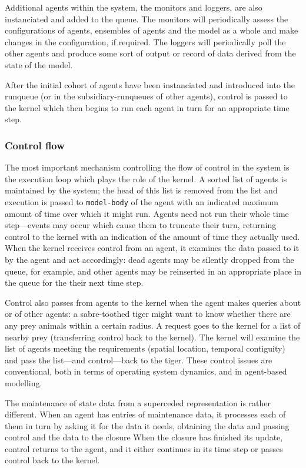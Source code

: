Additional agents within the system, the monitors and loggers, are
also instanciated and added to the queue. The monitors will
periodically assess the configurations of agents, ensembles of agents
and the model as a whole and make changes in the configuration, if
required.  The loggers will periodically poll the other agents and
produce some sort of output or record of data derived from the state
of the model.

After the initial cohort of agents have been instanciated and
introduced into the runqueue (or in the subsidiary-runqueues of other
agents), control is passed to the kernel which then begins to run each
agent in turn for an appropriate time step.

\subsubsection{Control flow}

The most important mechanism controlling the flow of control in the
system is the execution loop which plays the role of the kernel. A
sorted list of agents is maintained by the system; the head of this
list is removed from the list and execution is passed to
\texttt{model-body} of the agent with an indicated maximum amount of
time over which it might run.  Agents need not run their whole time
step---events may occur which cause them to truncate their turn,
returning control to the kernel with an indication of the amount of
time they actually used.  When the kernel receives control from an
agent, it examines the data passed to it by the agent and act
accordingly: dead agents may be silently dropped from the queue, for
example, and other agents may be reinserted in an appropriate place in
the queue for the their next time step.

Control also passes from agents to the kernel when the agent makes
queries about or of other agents: a sabre-toothed tiger might want to
know whether there are any prey animals within a certain radius.  A
request goes to the kernel for a list of nearby prey (transferring
control back to the kernel).  The kernel will examine the list of
agents meeting the requirements (spatial location, temporal
contiguity) and pass the list---and control---back to the tiger.
These control issues are conventional, both in terms of operating
system dynamics, and in agent-based modelling.

The maintenance of state data from a superceded representation is
rather different. When an agent has entries of maintenance data, it
processes each of them in turn by asking it for the data it needs,
obtaining the data and passing control and the data to the closure
When the closure has finished its update, control returns to the
agent, and it either continues in its time step or passes control back
to the kernel.

